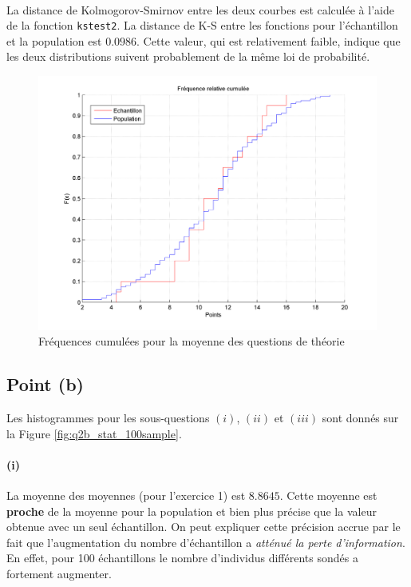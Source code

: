 \documentclass[a4paper,11pt]{article}
\begin{document}
\paragraph{}
La distance de Kolmogorov-Smirnov entre les deux courbes est calculée à l'aide de la fonction \texttt{kstest2}. La distance de K-S entre les fonctions pour l'échantillon et la population est $\mathbf{0.0986}$. Cette valeur, qui est relativement faible, indique que les deux distributions suivent probablement de la même loi de probabilité.

\begin{figure}[!h]
	\center
	\includegraphics[scale=0.5]{q1aiii-freqcum.png}
	\caption{Fréquences cumulées pour la moyenne des questions de théorie}
	\label{fig:q2iii_freq}
\end{figure}

\subsection{Point (b)}
Les histogrammes pour les sous-questions $(i)$, $(ii)$ et $(iii)$ sont donnés sur la Figure \ref{fig:q2b_stat_100sample}.
\paragraph{(i)} La moyenne des moyennes (pour l'exercice 1) est $\mathbf{8.8645}$. Cette moyenne est \textbf{proche} de la moyenne pour la population et bien plus précise que la valeur obtenue avec un seul échantillon. 
On peut expliquer cette précision accrue par le fait que l'augmentation du nombre d'échantillon a \textit{atténué la perte d'information}. En effet, pour 100 échantillons le nombre d'individus différents sondés a fortement augmenter.
\end{document}
